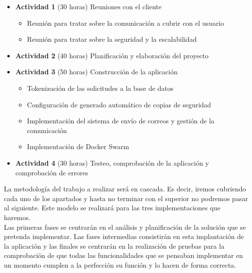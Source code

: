 \begin{itemize}
    \item \textbf{Actividad 1} (30 horas) Reuniones con el cliente
          \begin{itemize}
              \item Reunión para tratar sobre la comunicación a cubrir con el usuario
              \item Reunión para tratar sobre la seguridad y la escalabilidad
          \end{itemize}
    \item \textbf{Actividad 2} (40 horas) Planificación y elaboración del proyecto
    \item \textbf{Actividad 3} (50 horas) Construcción de la aplicación
          \begin{itemize}
              \item Tokenización de las solicitudes a la base de datos
              \item Configuración de generado automático de copias de seguridad
              \item Implementación del sistema de envío de correos y gestión de la comunicación
              \item Implementación de Docker Swarm
          \end{itemize}
    \item \textbf{Actividad 4} (30 horas) Testeo, comprobación de la aplicación y comprobación de errores
\end{itemize}

La metodología del trabajo a realizar será en cascada. Es decir, iremos cubriendo cada uno de los apartados y hasta no terminar con el superior no podremos pasar al siguiente. Este modelo se realizará para las tres implementaciones que haremos.
\\Las primeras fases se centrarán en el análisis y planificación de la solución que se pretenda implementar. Las fases intermedias consistirán en esta implantación de la aplicación y las finales se centrarán en la realización de pruebas para la comprobación de que todas las funcionalidades que se pensaban implementar en un momento cumplen a la perfección su función y lo hacen de forma correcta.